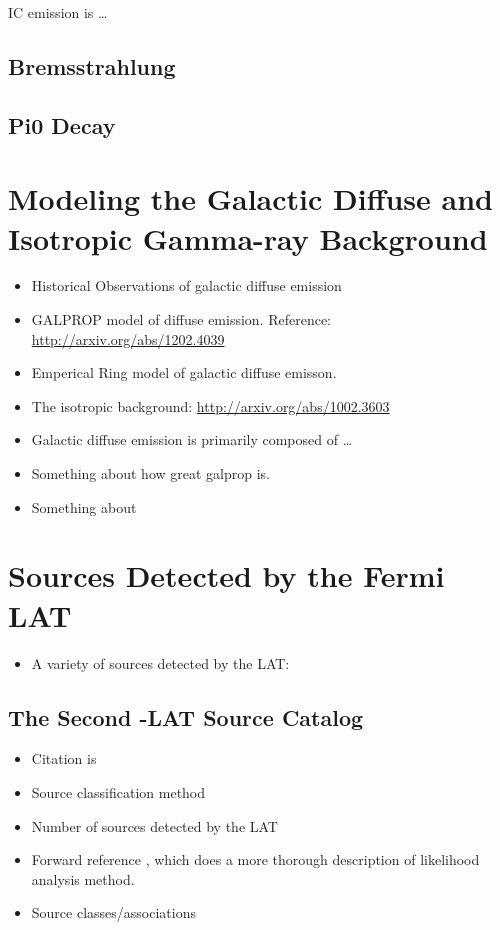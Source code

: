\ac{IC} emission is \ldots

\subsection{Bremsstrahlung}

\subsection{Pi0 Decay}

\section{Modeling the Galactic Diffuse and Isotropic Gamma-ray Background}

\begin{itemize}
  \item Historical Observations of galactic diffuse emission
  \item GALPROP model of diffuse emission.
  Reference: \url{http://arxiv.org/abs/1202.4039}
  \item Emperical Ring model of galactic diffuse emisson.
  \item The isotropic background: \url{http://arxiv.org/abs/1002.3603}
\end{itemize}

\begin{itemize}
  \item Galactic diffuse emission is primarily composed of \ldots
  \item Something about how great galprop is.
  \item Something about
\end{itemize}

\section{Sources Detected by the Fermi \acs{LAT}}

\begin{itemize}
  \item A variety of sources detected by the \acs{LAT}:
\end{itemize}

\subsection{The Second \fermi-\acs{LAT} Source Catalog}

\begin{itemize}
  \item Citation is \cite{second_lat_catalog_2012}
  \item Source classification method
  \item Number of sources detected by the \ac{LAT}
  \item Forward reference ,
    which does a more thorough description of likelihood analysis method.
  \item Source classes/associations
\end{itemize}

